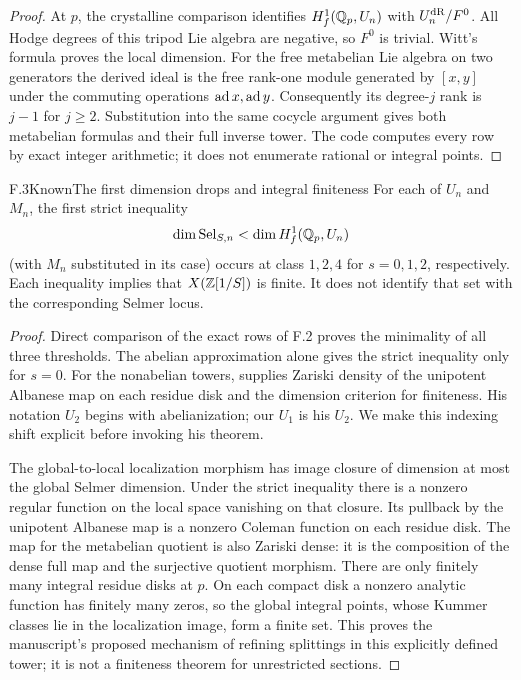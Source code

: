 \begin{proof}
At $p$, the crystalline comparison identifies
$H_f^1(\mathbb Q_p,U_n)$ with $U_n^{\rm dR}/F^0$.
All Hodge degrees of this tripod Lie algebra are negative,
so $F^0$ is trivial. Witt's formula proves the local
dimension. For the free metabelian Lie algebra on two
generators the derived ideal is the free rank-one module
generated by $[x,y]$ under the commuting operations
$\operatorname{ad} x,\operatorname{ad} y$. Consequently its degree-$j$ rank is $j-1$
for $j\ge2$. Substitution into the same cocycle argument
gives both metabelian formulas and their full inverse
tower. The code computes every row by exact integer
arithmetic; it does not enumerate rational or integral
points.
\end{proof}

\begin{statement}{F.3}{Known}{The first dimension drops and integral finiteness}
For each of $U_n$ and $M_n$, the first strict inequality
\[
 \dim\operatorname{Sel}_{S,n}<\dim H_f^1(\mathbb Q_p,U_n)
\]
(with $M_n$ substituted in its case) occurs at class
$1,2,4$ for $s=0,1,2$, respectively. Each inequality
implies that $X(\mathbb Z[1/S])$ is finite. It does not identify
that set with the corresponding Selmer locus.
\end{statement}
\begin{proof}
Direct comparison of the exact rows of F.2 proves the
minimality of all three thresholds. The abelian
approximation alone gives the strict inequality only
for $s=0$. For the nonabelian towers,
\citet[Theorem 1 and \S3]{Kim2009} supplies Zariski density
of the unipotent Albanese map on each residue disk and
the dimension criterion for finiteness. His notation
$U_2$ begins with abelianization; our $U_1$ is his $U_2$.
We make this indexing shift explicit before invoking
his theorem.

The global-to-local localization morphism has image
closure of dimension at most the global Selmer dimension.
Under the strict inequality there is a nonzero regular
function on the local space vanishing on that closure.
Its pullback by the unipotent Albanese map is a nonzero
Coleman function on each residue disk. The map for the
metabelian quotient is also Zariski dense: it is the
composition of the dense full map and the surjective
quotient morphism. There are only finitely many integral
residue disks at $p$. On each compact disk a nonzero
analytic function has finitely many zeros, so the
global integral points, whose Kummer classes lie in
the localization image, form a finite set. This proves
the manuscript's proposed mechanism of refining
splittings in this explicitly defined tower; it is not
a finiteness theorem for unrestricted sections.
\end{proof}

